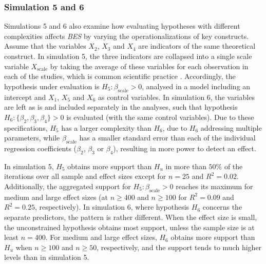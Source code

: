 \documentclass[review, 3p, authoryear]{elsarticle} %
\begin{document}
\hypertarget{simulation-5-and-6}{%
\subsubsection{Simulation 5 and 6}\label{simulation-5-and-6}}

Simulations 5 and 6 also examine how evaluating hypotheses with different complexities affects \emph{BES} by varying the operationalizations of key constructs.
Assume that the variables \(X_2\), \(X_3\) and \(X_4\) are indicators of the same theoretical construct.
In simulation 5, the three indicators are collapsed into a single scale variable \(X_{\text{scale}}\) by taking the average of these variables for each observation in each of the studies, which is common scientific practice \citep{bauer_discrepancy_2016}.
Accordingly, the hypothesis under evaluation is \(H_5: \beta_{\text{scale}} > 0\), analysed in a model including an intercept and \(X_1\), \(X_5\) and \(X_6\) as control variables.
In simulation 6, the variables are left as is and included separately in the analyses, such that hypothesis \(H_6: \{\beta_2,\beta_3,\beta_4\} > 0\) is evaluated (with the same control variables).
Due to these specifications, \(H_5\) has a larger complexity than \(H_6\), due to \(H_6\) addressing multiple parameters, while \(\beta_{\text{scale}}\) has a smaller standard error than each of the individual regression coefficients (\(\beta_2\), \(\beta_3\) or \(\beta_4\)), resulting in more power to detect an effect.

In simulation 5, \(H_5\) obtains more support than \(H_u\) in more than \(50\%\) of the iterations over all sample and effect sizes except for \(n = 25\) and \(R^2 = 0.02\).
Additionally, the aggregated support for \(H_5: \beta_{\text{scale}}>0\) reaches its maximum for medium and large effect sizes (at \(n \geq 400\) and \(n \geq 100\) for \(R^2 = 0.09\) and \(R^2 = 0.25\), respectively).
In simulation 6, where hypothesis \(H_6\) concerns the separate predictors, the pattern is rather different.
When the effect size is small, the unconstrained hypothesis obtains most support, unless the sample size is at least \(n = 400\).
For medium and large effect sizes, \(H_6\) obtains more support than \(H_u\) when \(n \geq 100\) and \(n \geq 50\), respectively, and the support tends to much higher levels than in simulation 5.
\end{document}
